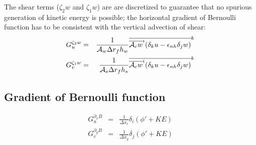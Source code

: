 The shear terms ($\zeta_2w$ and $\zeta_1w$) are are discretized to
guarantee that no spurious generation of kinetic energy is possible;
the horizontal gradient of Bernoulli function has to be consistent
with the vertical advection of shear:
\begin{eqnarray}
G_u^{\zeta_2 w} & = &
\frac{1}{ {\cal A}_w \Delta r_f h_w } \overline{
\overline{ {\cal A}_c w }^i ( \delta_k u - \epsilon_{nh} \delta_j w )
}^k \\
G_v^{\zeta_1 w} & = &
\frac{1}{ {\cal A}_s \Delta r_f h_s } \overline{
\overline{ {\cal A}_c w }^i ( \delta_k u - \epsilon_{nh} \delta_j w )
}^k
\end{eqnarray}




\subsection{Gradient of Bernoulli function}

\begin{eqnarray}
G_u^{\partial_x B} & = &
\frac{1}{\Delta x_c} \delta_i ( \phi' + KE ) \\
G_v^{\partial_y B} & = &
\frac{1}{\Delta x_y} \delta_j ( \phi' + KE )
\end{eqnarray}




